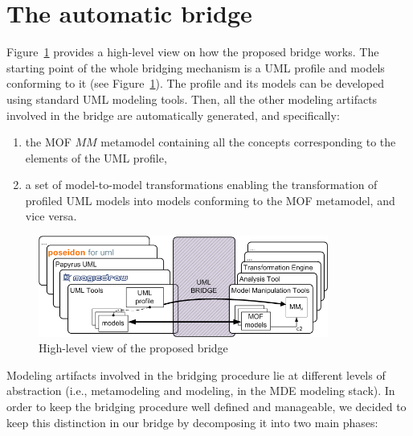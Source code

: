 \section{The automatic bridge}\label{sec:framework}
%

Figure~\ref{fig:overall} provides a high-level view on how the proposed bridge works. The starting point of the whole bridging mechanism is a UML profile and models conforming to it (see Figure~\ref{fig:overall}). The profile and its models can be developed using standard UML modeling tools. Then, all the other modeling artifacts involved in the bridge are automatically generated, and specifically:
\vspace{-.1cm}
\begin{enumerate}
	\item the MOF $MM$ metamodel containing all the concepts corresponding to the elements of the UML profile,
	\item a set of model-to-model transformations enabling the transformation of profiled UML models into models
conforming to the MOF metamodel, and vice versa.
\end{enumerate}
%
\vspace{-.6cm}
\begin{figure}[htbp]
	\centering
		\includegraphics[width=0.85\textwidth]{figures/overview.png}
	\caption{High-level view of the proposed bridge}
	\label{fig:overall}
\end{figure}
\vspace{-.6cm}
Modeling artifacts involved in the bridging procedure lie at different levels of abstraction
(i.e., metamodeling and modeling, in the MDE modeling stack). In order to keep the bridging procedure well defined and manageable,
we decided to keep this distinction in our bridge by decomposing it into two main phases:
